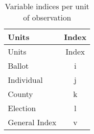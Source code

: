 \documentclass[]{article}
\begin{document}
\begin{longtable}[]{@{}lc@{}}
\caption{Variable indices per unit of observation
\label{tab:units_vars}}\tabularnewline
\toprule
\begin{minipage}[b]{0.27\columnwidth}\raggedright\strut
Units\strut
\end{minipage} & \begin{minipage}[b]{0.16\columnwidth}\centering\strut
Index\strut
\end{minipage}\tabularnewline
\midrule
\endfirsthead
\toprule
\begin{minipage}[b]{0.27\columnwidth}\raggedright\strut
Units\strut
\end{minipage} & \begin{minipage}[b]{0.16\columnwidth}\centering\strut
Index\strut
\end{minipage}\tabularnewline
\midrule
\endhead
\begin{minipage}[t]{0.27\columnwidth}\raggedright\strut
Ballot\strut
\end{minipage} & \begin{minipage}[t]{0.16\columnwidth}\centering\strut
i\strut
\end{minipage}\tabularnewline
\begin{minipage}[t]{0.27\columnwidth}\raggedright\strut
Individual\strut
\end{minipage} & \begin{minipage}[t]{0.16\columnwidth}\centering\strut
j\strut
\end{minipage}\tabularnewline
\begin{minipage}[t]{0.27\columnwidth}\raggedright\strut
County\strut
\end{minipage} & \begin{minipage}[t]{0.16\columnwidth}\centering\strut
k\strut
\end{minipage}\tabularnewline
\begin{minipage}[t]{0.27\columnwidth}\raggedright\strut
Election\strut
\end{minipage} & \begin{minipage}[t]{0.16\columnwidth}\centering\strut
l\strut
\end{minipage}\tabularnewline
\begin{minipage}[t]{0.27\columnwidth}\raggedright\strut
General Index\strut
\end{minipage} & \begin{minipage}[t]{0.16\columnwidth}\centering\strut
v\strut
\end{minipage}\tabularnewline
\bottomrule
\end{longtable}
\end{document}
